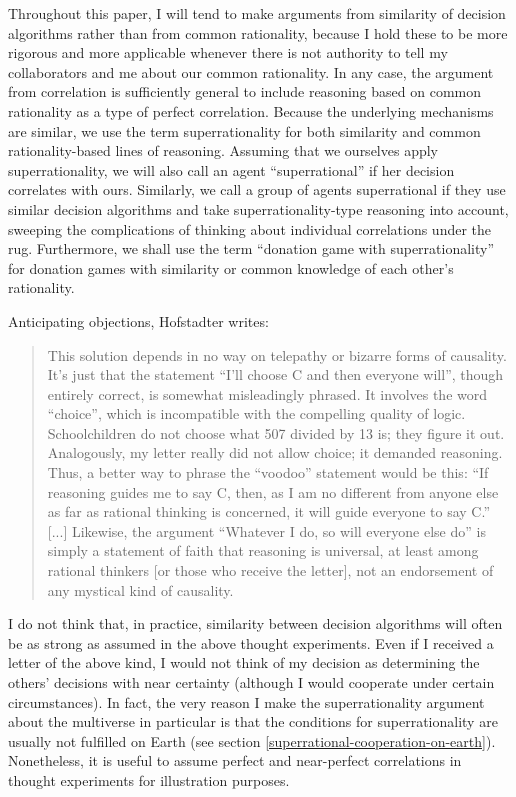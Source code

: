 Throughout this paper, I will tend to make arguments from similarity of
decision algorithms rather than from common rationality, because I hold
these to be more rigorous and more applicable whenever there is not
authority to tell my collaborators and me about our common rationality.
In any case, the argument from correlation is sufficiently general to
include reasoning based on common rationality as a type of perfect
correlation. Because the underlying mechanisms are similar, we use the
term superrationality for both similarity and common rationality-based
lines of reasoning. Assuming that we ourselves apply superrationality,
we will also call an agent ``superrational'' if her decision correlates
with ours. Similarly, we call a group of agents superrational if they
use similar decision algorithms and take superrationality-type reasoning
into account, sweeping the complications of thinking about individual
correlations under the rug. Furthermore, we shall use the term
``donation game with superrationality'' for donation games with
similarity or common knowledge of each other's rationality.

Anticipating objections, Hofstadter
\citeyear{Hofstadter1983-az} writes:

\begin{quote}
This solution depends in no way on telepathy or bizarre forms of
causality. It's just that the statement ``I'll choose C and then everyone
will'', though entirely correct, is somewhat misleadingly phrased. It
involves the word ``choice'', which is incompatible with the compelling
quality of logic. Schoolchildren do not choose what 507 divided by 13
is; they figure it out. Analogously, my letter really did not allow
choice; it demanded reasoning. Thus, a better way to phrase the ``voodoo''
statement would be this: ``If reasoning guides me to say C, then, as I am
no different from anyone else as far as rational thinking is concerned,
it will guide everyone to say C.'' {[}...{]} Likewise, the argument
``Whatever I do, so will everyone else do'' is simply a statement of faith
that reasoning is universal, at least among rational thinkers {[}or
those who receive the letter{]}, not an endorsement of any mystical kind
of causality.
\end{quote}

I do not think that, in practice, similarity between decision algorithms
will often be as strong as assumed in the above thought experiments.
Even if I received a letter of the above kind, I would not think of my
decision as determining the others' decisions with near certainty
(although I would cooperate under certain circumstances). In fact, the
very reason I make the superrationality argument about the multiverse in
particular is that the conditions for superrationality are usually not
fulfilled on Earth (see section
\ref{superrational-cooperation-on-earth}). Nonetheless, it is useful to assume perfect
and near-perfect correlations in thought experiments for illustration
purposes.

